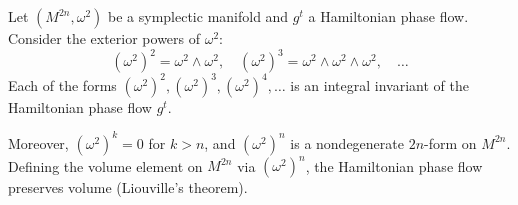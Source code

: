 Let $(M^{2n}, \omega^2)$ be a symplectic manifold and $g^t$ a Hamiltonian phase flow. Consider the exterior powers of $\omega^2$:
$$
(\omega^2)^2 = \omega^2 \wedge \omega^2, \quad (\omega^2)^3 = \omega^2 \wedge \omega^2 \wedge \omega^2, \quad \ldots
$$
Each of the forms $(\omega^2)^2, (\omega^2)^3, (\omega^2)^4, \ldots$ is an integral invariant of the Hamiltonian phase flow $g^t$.

Moreover, $(\omega^2)^k = 0$ for $k > n$, and $(\omega^2)^n$ is a nondegenerate $2n$-form on $M^{2n}$. Defining the volume element on $M^{2n}$ via $(\omega^2)^n$, the Hamiltonian phase flow preserves volume (Liouville's theorem).
